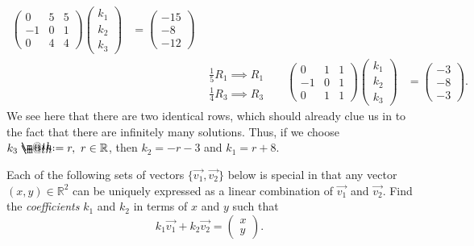 \documentclass{article}
\makeatletter
\newcommand*{\defeq}{\mathrel{\rlap{%
                     \raisebox{0.3ex}{$\m@th\cdot$}}%
                     \raisebox{-0.3ex}{$\m@th\cdot$}}%
                     =}
\makeatother
\begin{document}
\begin{enumerate}
\begin{solution}
\begin{align*}
\begin{pmatrix}
                0&5&5\\-1&0&1\\0&4&4
            \end{pmatrix} \begin{pmatrix}
                k_1\\k_2\\k_3
            \end{pmatrix} &= \begin{pmatrix}
                -15\\-8\\-12
            \end{pmatrix}\\
            &&  \begin{matrix}\\\frac{1}{5}R_1 \implies R_1\\\frac{1}{4}R_3 \implies R_3 \end{matrix}&&\begin{pmatrix}
                0&1&1\\-1&0&1\\0&1&1
            \end{pmatrix} \begin{pmatrix}
                k_1\\k_2\\k_3
            \end{pmatrix} &= \begin{pmatrix}
                -3\\-8\\-3
            \end{pmatrix}.
        \end{align*} We see here that there are two identical rows, which should already clue us in to the fact that there are infinitely many solutions. Thus, if we choose \(k_3 \defeq r,~r\in\mathbb{R}\), then \(k_2=-r-3\) and \(k_1=r+8\).
    \end{solution}
\end{enumerate}
\pagebreak
\begin{center}
    \colorbox{CornflowerBlue!50}{
    \begin{minipage}[c]{0.9\textwidth}
        \centering
        Each of the following sets of vectors \(\lbrace\overrightarrow{v_1},\overrightarrow{v_2}\rbrace\) below is special in that any vector \((x,y) \in \mathbb{R}^2 \) can be uniquely 
        expressed as a linear combination of \(\overrightarrow{v_1}\) and \(\overrightarrow{v_2}\). Find the \textit{coefficients} \(k_1\) and \(k_2\) in terms of \(x\) and \(y\) such that\[
            k_1\overrightarrow{v_1} + k_2\overrightarrow{v_2} = \begin{pmatrix}
                x\\y
            \end{pmatrix}.
        \]
    \end{minipage}
    }\end{center}
\end{document}
